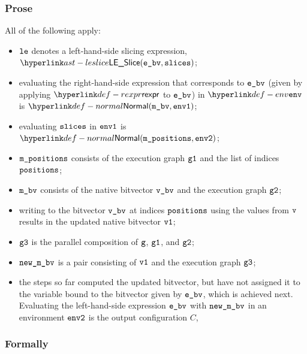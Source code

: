 \subsubsection{Prose}
All of the following apply:
\begin{itemize}
  \item $\vle$ denotes a left-hand-side slicing expression, $\LESlice(\ebv, \slices)$;
  \item evaluating the right-hand-side expression that corresponds to $\ebv$
  (given by applying $\torexpr$ to $\ebv$) in $\env$
    is $\Normal(\mbv,\envone)$\ProseOrAbnormal;
  \item evaluating $\slices$ in $\envone$ is $\Normal(\mpositions, \envtwo)$\ProseOrAbnormal;
  \item $\mpositions$ consists of the execution graph $\vgone$ and the list of indices $\positions$;
  \item $\mbv$ consists of the native bitvector $\vbv$ and the execution graph $\vgtwo$;
  \item writing to the bitvector $\vbv$ at indices $\positions$ using the values from $\vv$
  results in the updated native bitvector $\vvone$\ProseOrError;
  \item $\vgthree$ is the parallel composition of $\vg$, $\vgone$, and $\vgtwo$;
  \item $\newmbv$ is a pair consisting of $\vvone$ and the execution graph $\vgthree$;
  \item the steps so far computed the updated bitvector, but have not assigned it to the
  variable bound to the bitvector given by $\ebv$, which is achieved next.
  Evaluating the left-hand-side expression $\ebv$ with
  $\newmbv$ in an environment $\envtwo$ is the output configuration $C$,
\end{itemize}
\subsubsection{Formally}
\begin{mathpar}
\end{mathpar}
